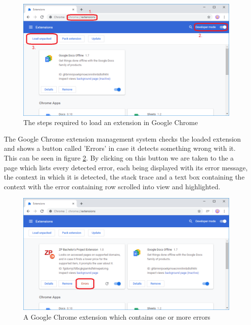 \documentclass[12pt,a4paper,twoside]{report}
\begin{document}
\begin{figure}[ht]
  \centering
  \includegraphics[width=\linewidth]{img/loading_an_extension.png}
  \caption[]{The steps required to load an extension in Google Chrome}
  \label{fig:loading_an_extension}
\end{figure}

The Google Chrome extension management system checks the loaded extension and shows a button called 'Errors' in case it detects something wrong with it. This can be seen in figure \ref{fig:extension_error}. By clicking on this button we are taken to the a page which lists every detected error, each being displayed with its error message, the context in which it is detected, the stack trace and a text box containing the context with the error containing row scrolled into view and highlighted.

\begin{figure}[ht]
  \centering
  \includegraphics[width=\linewidth]{img/extension_error.png}
  \caption[]{A Google Chrome extension which contains one or more errors}
  \label{fig:extension_error}
\end{figure}
\end{document}
